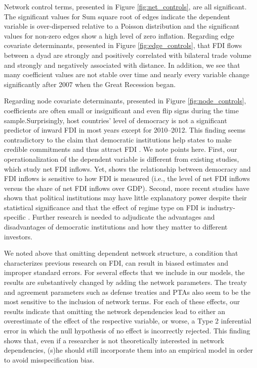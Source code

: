 \documentclass[reqno,onecolumn,letterpaper,12pt]{article}
\begin{document}
Network control terms, presented in Figure \ref{fig:net_controls}, are all significant. The significant values for Sum square root of edges indicate the dependent variable is over-dispersed relative to a Poisson distribution and the significant values for non-zero edges show a high level of zero inflation. Regarding edge covariate determinants, presented in Figure \ref{fig:edge_controls}, that FDI flows between a dyad are strongly and positively correlated with bilateral trade volume and strongly and negatively associated with distance. In addition, we see that many coefficient values are not stable over time and nearly every variable change significantly after 2007 when the Great Recession began. 


Regarding node covariate determinants, presented in Figure \ref{fig:node_controls}, coefficients are often small or insignificant and even flip signs during the time sample.Surprisingly, host countries' level of democracy is not a significant predictor of inward FDI in most years except for 2010--2012. This finding seems contradictory to the claim that democratic institutions help states to make credible commitments and thus attract FDI \cite[e.g.,][]{Jensen:2003,Henisz:2000}. We note points here. First, our operationalization of the dependent variable is different from existing studies, which study net FDI inflows. Yet, \citet{Li_et_al:2018} shows the relationship between democracy and FDI inflows is sensitive to how FDI is measured (i.e., the level of net FDI inflows versus the share of net FDI inflows over GDP). Second, more recent studies have shown that political institutions may have little explanatory power despite their statistical significance \citep{Arel-Bundock:2017b} and that the effect of regime type on FDI is industry-specific \citep{Wright_Zhu:2018}. Further research is needed to adjudicate the advantages and disadvantages of democratic institutions and how they matter to different investors. 



We noted above that omitting dependent network structure, a condition that characterizes previous research on FDI, can result in biased estimates and improper standard errors. For several effects that we include in our models, the results are substantively changed by adding the network parameters. The treaty and agreement parameters such as defense treaties and PTAs also seem to be the most sensitive to the inclusion of network terms. For each of these effects, our results indicate that omitting the network dependencies lead to either an overestimate of the effect of the respective variable, or worse, a Type 2 inferential error in which the null hypothesis of no effect is incorrectly rejected. This finding shows that, even if a researcher is not theoretically interested in network dependencies, (s)he should still incorporate them into an empirical model in order to avoid misspecification bias.
\end{document}
